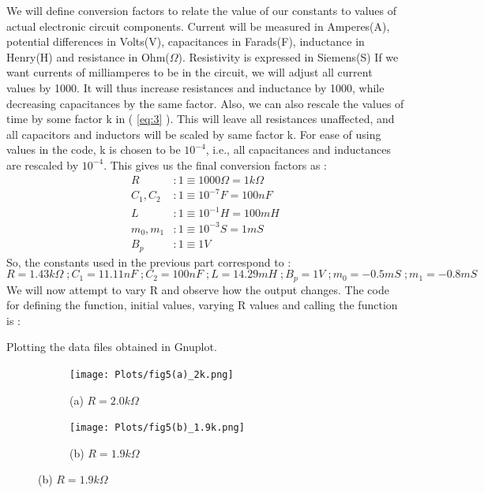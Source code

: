 \documentclass[12pt]{article}
\newcommand*{\myref}[1]{%
  \begingroup
    \hypersetup{
      linkcolor=linkequation,
      linkbordercolor=linkequation,
    }%
    \ref{#1}%
  \endgroup
}
\begin{document}
We will define conversion factors to relate the value of our constants to values of actual electronic circuit components. Current will be measured in Amperes(A), potential differences in Volts(V), capacitances in Farads(F), inductance in Henry(H) and resistance in Ohm($\Omega$). Resistivity is expressed in Siemens(S)\linebreak
If we want currents of milliamperes to be in the circuit, we will adjust all current values by 1000. It will thus increase resistances and inductance by 1000, while decreasing capacitances by the same factor. Also, we can also rescale the values of time by some factor k in (\myref{eq:3}). This will leave all resistances unaffected, and all capacitors and inductors will be scaled by same factor k. For ease of using values in the code, k is chosen to be $10^{-4}$, i.e., all capacitances and inductances are rescaled by $10^{-4}$. This gives us the final conversion factors as :
\begin{align*}
	R & : 1 \equiv 1000 \Omega = 1k\Omega \\
	C_1, C_2 & : 1 \equiv 10^{-7} F = 100 nF \\
	L & : 1 \equiv 10^{-1} H = 100 mH \\
	m_0, m_1 & : 1 \equiv 10^{-3} S = 1 mS \\
	B_p & : 1 \equiv 1 V
\end{align*}
So, the constants used in the previous part correspond to :
\begin{equation*}
	R=1.43k\Omega \; ;  C_1=11.11 nF \; ; C_2=100 nF \; ; L=14.29 mH \; ; B_p = 1V \; ; m_0 = -0.5 mS \; ; m_1 = -0.8 mS
\end{equation*}
We will now attempt to vary R and observe how the output changes. \linebreak
The code for defining the function, initial values, varying R values and calling the function is :

Plotting the data files obtained in Gnuplot. 
\begin{figure}[H] %
	\centering
	\caption{Fig 5. R Bifurcation in Theoretical Chua Circuit using a Three Segment Non-Linear Resistance}
	\begin{subfigure}[b]{0.5\textwidth}
		\centering
		\texttt{[image: Plots/fig5(a)\_2k.png]}
		\caption{(a) $R=2.0k\Omega$}
	\end{subfigure}%
	\begin{subfigure}[b]{0.5\textwidth}
		\centering
		\texttt{[image: Plots/fig5(b)\_1.9k.png]}
		\caption{(b) $R=1.9k\Omega$}
	\end{subfigure}
\end{figure}
\end{document}
